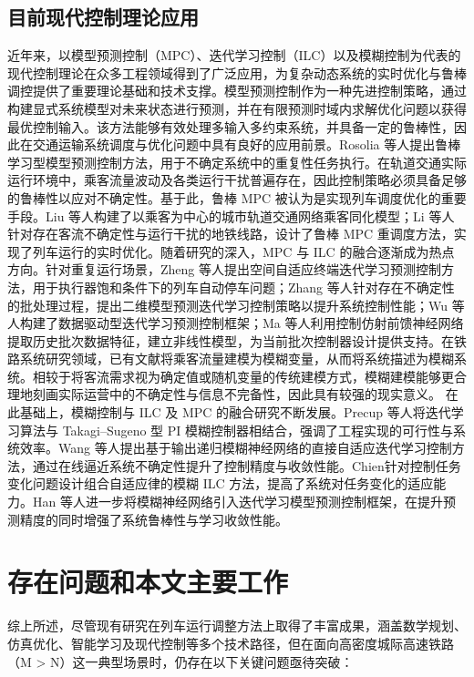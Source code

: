 \subsection{目前现代控制理论应用}
近年来，以模型预测控制（MPC）、迭代学习控制（ILC）以及模糊控制为代表的现代控制理论在众多工程领域得到了广泛应用，为复杂动态系统的实时优化与鲁棒调控提供了重要理论基础和技术支撑。模型预测控制作为一种先进控制策略，通过构建显式系统模型对未来状态进行预测，并在有限预测时域内求解优化问题以获得最优控制输入。该方法能够有效处理多输入多约束系统，并具备一定的鲁棒性\cite{Garcia1989,Maciejonski1999}，因此在交通运输系统调度与优化问题中具有良好的应用前景。Rosolia 等人\cite{Rosolia2022a}提出鲁棒学习型模型预测控制方法，用于不确定系统中的重复性任务执行。在轨道交通实际运行环境中，乘客流量波动及各类运行干扰普遍存在，因此控制策略必须具备足够的鲁棒性以应对不确定性。基于此，鲁棒 MPC 被认为是实现列车调度优化的重要手段\cite{Kothare1996}。Liu 等人\cite{Liu2023}构建了以乘客为中心的城市轨道交通网络乘客同化模型；Li 等人\cite{Li2016}针对存在客流不确定性与运行干扰的地铁线路，设计了鲁棒 MPC 重调度方法，实现了列车运行的实时优化。随着研究的深入，MPC 与 ILC 的融合逐渐成为热点方向。针对重复运行场景，Zheng 等人\cite{Zheng2023}提出空间自适应终端迭代学习预测控制方法，用于执行器饱和条件下的列车自动停车问题；Zhang 等人\cite{Zhang2021}针对存在不确定性的批处理过程，提出二维模型预测迭代学习控制策略以提升系统控制性能；Wu 等人\cite{Wu2022}构建了数据驱动型迭代学习预测控制框架；Ma 等人\cite{Ma2021}利用控制仿射前馈神经网络提取历史批次数据特征，建立非线性模型，为当前批次控制器设计提供支持。在铁路系统研究领域，已有文献\cite{Yang2009,Wang2020}将乘客流量建模为模糊变量，从而将系统描述为模糊系统。相较于将客流需求视为确定值或随机变量的传统建模方式，模糊建模能够更合理地刻画实际运营中的不确定性与信息不完备性，因此具有较强的现实意义。
在此基础上，模糊控制与 ILC 及 MPC 的融合研究不断发展。Precup 等人\cite{Precup2008}将迭代学习算法与 Takagi–Sugeno 型 PI 模糊控制器相结合，强调了工程实现的可行性与系统效率。Wang 等人\cite{wang2004direct}提出基于输出递归模糊神经网络的直接自适应迭代学习控制方法，通过在线逼近系统不确定性提升了控制精度与收敛性能。Chien\cite{chien2008combined}针对控制任务变化问题设计组合自适应律的模糊 ILC 方法，提高了系统对任务变化的适应能力。Han 等人\cite{han2023iterative}进一步将模糊神经网络引入迭代学习模型预测控制框架，在提升预测精度的同时增强了系统鲁棒性与学习收敛性能。


\section{存在问题和本文主要工作}
综上所述，尽管现有研究在列车运行调整方法上取得了丰富成果，涵盖数学规划、仿真优化、智能学习及现代控制等多个技术路径，但在面向高密度城际高速铁路（M > N）这一典型场景时，仍存在以下关键问题亟待突破：

